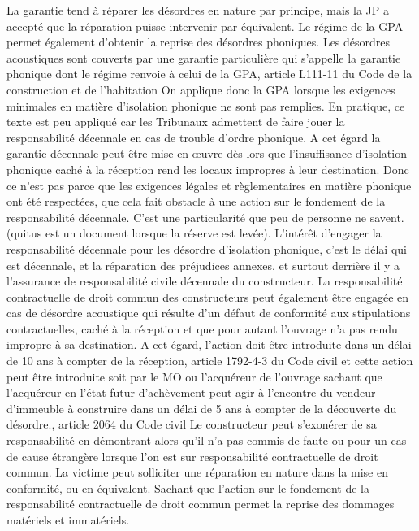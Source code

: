 			La garantie tend à réparer les désordres en nature par principe, mais la JP a accepté que la réparation puisse intervenir par équivalent.
			Le régime de la GPA permet également d’obtenir la reprise des désordres phoniques. Les désordres acoustiques sont couverts par une garantie particulière qui s’appelle la garantie phonique dont le régime renvoie à celui de la GPA, article L111-11 du Code de la construction et de l’habitation
			On applique donc la GPA lorsque les exigences minimales en matière d’isolation phonique ne sont pas remplies. En pratique, ce texte est peu appliqué car les Tribunaux admettent de faire jouer la responsabilité décennale en cas de trouble d’ordre phonique. A cet égard la garantie décennale peut être mise en œuvre dès lors que l’insuffisance d’isolation phonique caché à la réception rend les locaux impropres à leur destination.
			Donc ce n’est pas parce que les exigences légales et règlementaires en matière phonique ont été respectées, que cela fait obstacle à une action sur le fondement de la responsabilité décennale.
			C’est une particularité que peu de personne ne savent.
			(quitus est un document lorsque la réserve est levée).
			L’intérêt d’engager la responsabilité décennale pour les désordre d’isolation phonique, c’est le délai qui est décennale, et la réparation des préjudices annexes, et surtout derrière il y a l’assurance de responsabilité civile décennale du constructeur.
			La responsabilité contractuelle de droit commun des constructeurs peut également être engagée en cas de désordre acoustique qui résulte d’un défaut de conformité aux stipulations contractuelles, caché à la réception et que pour autant l’ouvrage n’a pas rendu impropre à sa destination.
			A cet égard, l’action doit être introduite dans un délai de 10 ans à compter de la réception, article 1792-4-3 du Code civil et cette action peut être introduite soit par le MO ou l’acquéreur de l’ouvrage sachant que l’acquéreur en l’état futur d’achèvement peut agir à l’encontre du vendeur d’immeuble à construire dans un délai de 5 ans à compter de la découverte du désordre., article 2064 du Code civil
			Le constructeur peut s’exonérer de sa responsabilité en démontrant alors qu’il n’a pas commis de faute ou pour un cas de cause étrangère lorsque l’on est sur responsabilité contractuelle de droit commun.
			La victime peut solliciter une réparation en nature dans la mise en conformité, ou en équivalent. Sachant que l’action sur le fondement de la responsabilité contractuelle de droit commun permet la reprise des dommages matériels et immatériels.


